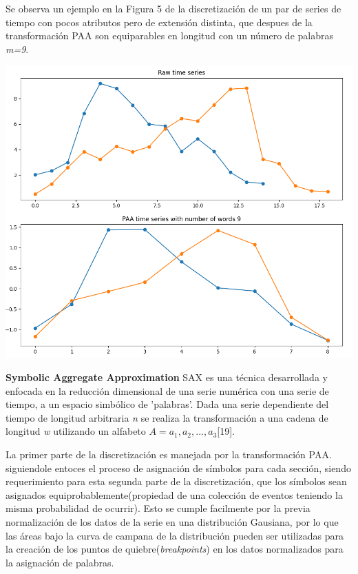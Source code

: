 	\hfill\break
	\justifying
	Se observa un ejemplo en la Figura 5 de la discretización de un par de series de tiempo con pocos atributos pero de extensión distinta, que despues de la transformación PAA son equiparables en longitud con un número de palabras \textit{m=9}.
	\begin{minipage}{\linewidth}
		\centering
		\includegraphics[width=\linewidth]{Imagenes/PAA.png}
	\end{minipage}
	
\hfill\break
\hfill\break
\justifying
\textbf{Symbolic Aggregate Approximation}
	\hfill\break
	\justifying
	SAX es una técnica desarrollada y enfocada en la reducción dimensional de una serie numérica con una serie de tiempo, a un espacio simbólico de 'palabras'. Dada una serie dependiente del tiempo de longitud arbitraria \textit{n} se realiza la transformación a una cadena de longitud \textit{w} utilizando un alfabeto $A={a_1,a_2,...,a_3}$[19].
	
	\hfill\break
	\justifying
	La primer parte de la discretización es manejada por la transformación PAA. siguiendole entoces el proceso de asignación de símbolos para cada sección, siendo requerimiento para esta segunda parte de la discretización, que los símbolos sean asignados equiprobablemente(propiedad de una colección de eventos teniendo la misma probabilidad de ocurrir). Esto se cumple facilmente por la previa normalización de los datos de la serie en una distribución Gausiana, por lo que las áreas bajo la curva de campana de la distribución pueden ser utilizadas para la creación de los puntos de quiebre(\textit{breakpoints}) en los datos normalizados para la asignación de palabras.
	

